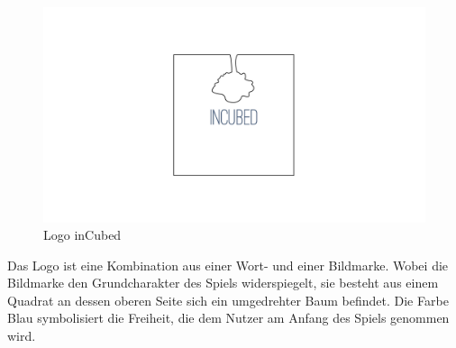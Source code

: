 
\begin{figure}[ht]%
	\centering
		\includegraphics[width=1.0\textwidth]{images/Logo}
	\caption{Logo inCubed}
	\label{fig:Logo}
\end{figure}

Das Logo ist eine Kombination aus einer Wort- und einer Bildmarke. Wobei die Bildmarke den Grundcharakter des Spiels widerspiegelt, sie besteht aus einem Quadrat an dessen oberen Seite sich ein umgedrehter Baum befindet. Die Farbe Blau symbolisiert die Freiheit, die dem Nutzer am Anfang des Spiels genommen wird.